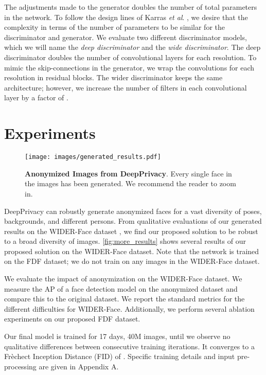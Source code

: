 \documentclass[runningheads]{llncs}
\newcommand{\etal}{\textit{et al}. }
\begin{document}
The adjustments made to the generator doubles the number of total parameters in the network. To follow the design lines of Karras \etal \cite{Karras2017}, we desire that the complexity in terms of the number of parameters to be similar for the discriminator and generator. We evaluate two different discriminator models, which we will name the \textit{deep discriminator} and the \textit{wide discriminator}. The deep discriminator doubles the number of convolutional layers for each resolution. To mimic the skip-connections in the generator, we wrap the convolutions for each resolution in residual blocks.
The wider discriminator keeps the same architecture; however, we increase the number of filters in each convolutional layer by a factor of . %
 \section{Experiments}

\begin{figure}
    \centering
    \texttt{[image: images/generated\_results.pdf]}
    \caption{\textbf{Anonymized Images from DeepPrivacy}. Every single face in the images has been generated. We recommend the reader to zoom in.}
    \label{fig:more_results}
\end{figure}

DeepPrivacy can robustly generate anonymized faces for a vast diversity of poses, backgrounds, and different persons.
From qualitative evaluations of our generated results on  the WIDER-Face dataset \cite{yang2016wider}, we find our proposed solution to  be robust to a broad diversity of images.
\autoref{fig:more_results} shows several results of our proposed solution on the WIDER-Face dataset. Note that the network is trained on the FDF dataset; we do not train on any images in the WIDER-Face dataset.


We evaluate the impact of anonymization on the WIDER-Face \cite{yang2016wider} dataset.
We measure the AP of a face detection model on the anonymized dataset and compare this to the original dataset.
We report the standard metrics for the different difficulties for WIDER-Face. Additionally, we perform several ablation experiments on our proposed FDF dataset.

Our final model is trained for 17 days, 40M images, until we observe no qualitative differences between consecutive training iterations. It converges to a Fr\`echect Inception Distance (FID) \cite{heusel2017gans} of . Specific training details and input pre-processing  are given in Appendix A.
\end{document}
